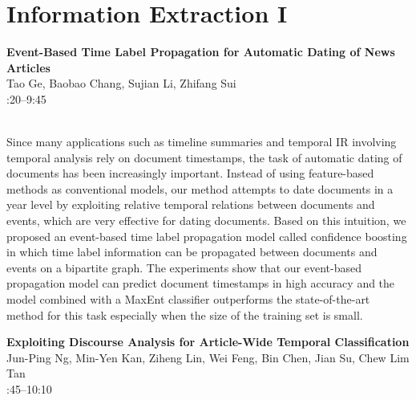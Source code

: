 \documentclass[twoside,makeidx]{book}
\renewcommand{\normalsize}{\fontsize{8}{9}\selectfont}
\renewcommand{\small}{\fontsize{7}{8}\selectfont}
\begin{document}
\section{Information Extraction I}
\vspace{-1em}
\par\vspace{2em}\noindent%
\begin{minipage}{\linewidth}%
\begin{center}
\textbf{\normalsize Event-Based Time Label Propagation for Automatic Dating of News Articles}\\
\normalsize  Tao Ge,  Baobao Chang,  Sujian Li,  Zhifang Sui\\
{\small 9:20--9:45}\\
\end{center}
\end{minipage}\\[0.5em]
\nopagebreak%
\noindent%
{\small Since many applications such as timeline summaries and temporal IR involving temporal analysis rely on document timestamps, the task of automatic dating of documents has been increasingly important. Instead of using feature-based methods as conventional models, our method attempts to date documents in a year level by exploiting relative temporal relations between documents and events, which are very effective for dating documents. Based on this intuition, we proposed an event-based time label propagation model called confidence boosting in which time label information can be propagated between documents and events on a bipartite graph. The experiments show that our event-based propagation model can predict document timestamps in high accuracy and the model combined with a MaxEnt classifier outperforms the state-of-the-art method for this task especially when the size of the training set is small.}
\par\vspace{2em}\noindent%
\begin{minipage}{\linewidth}%
\begin{center}
\textbf{\normalsize Exploiting Discourse Analysis for Article-Wide Temporal Classification}\\
\normalsize  Jun-Ping Ng,  Min-Yen Kan,  Ziheng Lin,  Wei Feng,  Bin Chen,  Jian Su,  Chew Lim Tan\\
{\small 9:45--10:10}\\
\end{center}
\end{minipage}\\[0.5em]
\end{document}
